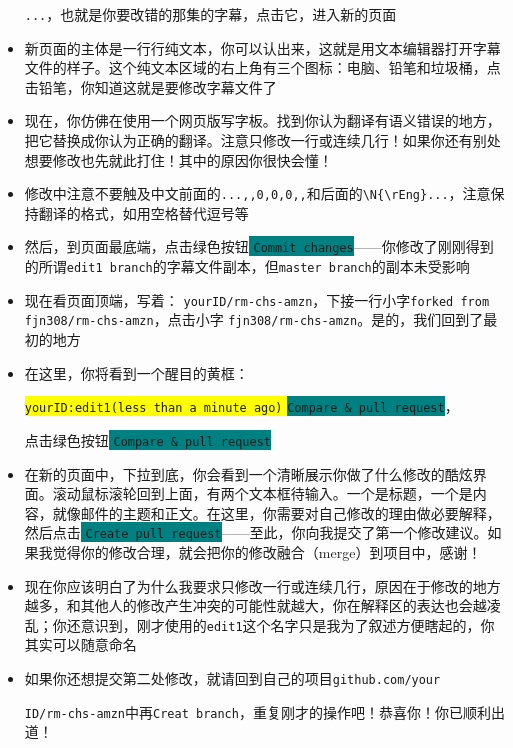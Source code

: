 \documentclass{ctexart}
\begin{document}
\begin{itemize}
    {\color{blue} \texttt{...}}，也就是你要改错的那集的字幕，点击它，进入新的页面
    \item 新页面的主体是一行行纯文本，你可以认出来，这就是用文本编辑器打开字幕文件的样子。这个纯文本区域的右上角有三个图标：电脑、铅笔和垃圾桶，点击铅笔，你知道这就是要修改字幕文件了
    \item 现在，你仿佛在使用一个网页版写字板。找到你认为翻译有语义错误的地方，把它替换成你认为正确的翻译。注意只修改一行或连续几行！如果你还有别处想要修改也先就此打住！其中的原因你很快会懂！
    \item 修改中注意不要触及中文前面的\texttt{...,,0,0,0,,}和后面的\texttt{\textbackslash N\{\textbackslash rEng\}...}，注意保持翻译的格式，如用空格替代逗号等
    \item 然后，到页面最底端，点击绿色按钮\colorbox{teal}{{\color{white} \texttt{Commit changes}}}——你修改了刚刚得到的所谓\texttt{edit1 branch}的字幕文件副本，但\texttt{master branch}的副本未受影响
    \item 现在看页面顶端，写着：{\color{blue} \texttt{yourID/rm-chs-amzn}}，下接一行小字\texttt{forked from} {\color{blue} \texttt{fjn308/rm-chs-amzn}}，点击小字{\color{blue} \texttt{fjn308/rm-chs-amzn}}。是的，我们回到了最初的地方
    \item 在这里，你将看到一个醒目的黄框：
    
    \colorbox{yellow}{\texttt{yourID:edit1(less than a minute ago)} \colorbox{teal}{{\color{white} \texttt{Compare \& pull request}}}}，
    
    点击绿色按钮\colorbox{teal}{{\color{white} \texttt{Compare \& pull request}}}
    \item 在新的页面中，下拉到底，你会看到一个清晰展示你做了什么修改的酷炫界面。滚动鼠标滚轮回到上面，有两个文本框待输入。一个是标题，一个是内容，就像邮件的主题和正文。在这里，你需要对自己修改的理由做必要解释，然后点击\colorbox{teal}{{\color{white} \texttt{Create pull request}}}——至此，你向我提交了第一个修改建议。如果我觉得你的修改合理，就会把你的修改融合（merge）到项目中，感谢！
    \item 现在你应该明白了为什么我要求只修改一行或连续几行，原因在于修改的地方越多，和其他人的修改产生冲突的可能性就越大，你在解释区的表达也会越凌乱；你还意识到，刚才使用的\texttt{edit1}这个名字只是我为了叙述方便瞎起的，你其实可以随意命名
    \item 如果你还想提交第二处修改，就请回到自己的项目\texttt{github.com/your}
    
    \texttt{ID/rm-chs-amzn}中再\texttt{Creat branch}，重复刚才的操作吧！恭喜你！你已顺利出道！
\end{itemize}
\end{document}
